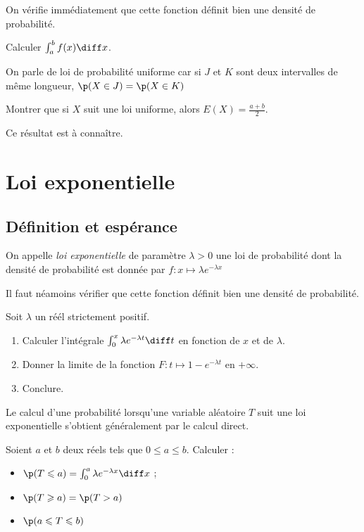 \documentclass[11pt,a4paper,french]{article}
\begin{document}
On vérifie immédiatement que cette fonction définit bien une densité de
probabilité.

\begin{question}
  Calculer $\int_a^b f(x) \diff x$.
\end{question}

On parle de loi de probabilité uniforme car si $J$ et $K$ sont deux
intervalles de même longueur, $\p(X\in J) = \p(X \in K)$

\begin{question}
  Montrer que si $X$ suit une loi uniforme, alors $E(X) = \frac{a+b}2$.
\end{question}

Ce résultat est à connaître.

\pagebreak

\section{Loi exponentielle}

\subsection{Définition et espérance}

\begin{definition}
  On appelle \emph{loi exponentielle} de paramètre $\lambda>0$ une loi
  de probabilité dont la densité de probabilité est donnée par
  $f:x\mapsto \lambda e^{-\lambda x}$
\end{definition}

Il faut néamoins vérifier que cette fonction définit bien une densité de
probabilité.

\begin{question}
  Soit $\lambda$ un réél strictement positif.
  \begin{enumerate}
    \item Calculer l'intégrale $\int_0^x \lambda e^{-\lambda t} \diff t$
      en fonction de $x$ et de $\lambda$.
    \item Donner la limite de la fonction $F:t \mapsto 1 - e^{-\lambda
      t}$ en $+\infty$.
    \item Conclure.
  \end{enumerate}
\end{question}

Le calcul d'une probabilité lorsqu'une variable aléatoire $T$ suit une
loi exponentielle s'obtient généralement par le calcul direct.

\begin{question}
  Soient $a$ et $b$ deux réels tels que $0\leqslant a \leqslant b$.
  Calculer :
  \begin{itemize}
    \item $\p(T \leqslant a) = \int_0^a \lambda e^{-\lambda x} \diff x$ ;
    \item $\p(T \geqslant a) = \p(T > a )$
    \item $\p(a \leqslant T \leqslant b)$
  \end{itemize}
\end{question}
\end{document}
